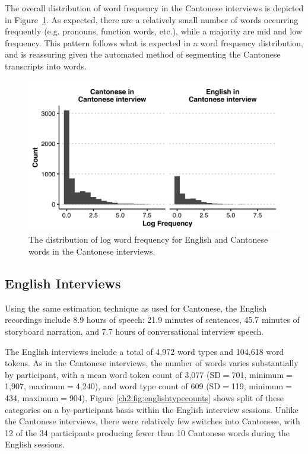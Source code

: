 The overall distribution of word frequency in the Cantonese interviews is depicted in Figure~\ref{ch2:fig:cantonesewordfrequency}. As expected, there are a relatively small number of words occurring frequently (e.g. pronouns, function words, etc.), while a majority are mid and low frequency. This pattern follows what is expected in a word frequency distribution, and is reassuring given the automated method of segmenting the Cantonese transcripts into words. 

\begin{figure}[h]
  \begin{center}
  \includegraphics[width=4.9in]{figures/ch2_cantonesewordfrequency_5in.png} 
  \caption{The distribution of log word frequency for English and Cantonese words in the Cantonese interviews.}
  \label{ch2:fig:cantonesewordfrequency}
  \end{center}
  \end{figure}

\subsection{English Interviews}\label{ch2:subsec:english_descriptive}

Using the same estimation technique as used for Cantonese, the English recordings include 8.9 hours of speech: 21.9 minutes of sentences, 45.7 minutes of storyboard narration, and 7.7 hours of conversational interview speech.

The English interviews include a total of 4,972 word types and 104,618 word tokens. As in the Cantonese interviews, the number of words varies substantially by participant, with a mean word token count of 3,077 (SD$=$701, minimum$=$1,907, maximum$=$4,240), and word type count of 609 (SD$=$119, minimum$=$434, maximum$=$904). Figure \ref{ch2:fig:englishtypecounts} shows split of these categories on a by-participant basis within the English interview sessions. Unlike the Cantonese interviews, there were relatively few switches into Cantonese, with 12 of the 34 participants producing fewer than 10 Cantonese words during the English sessions.

